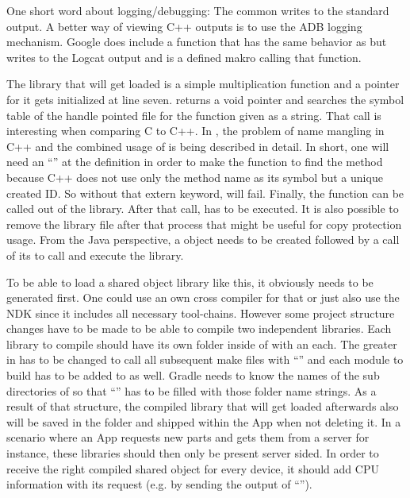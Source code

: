 One short word about logging/debugging: The common  writes to the standard output. A better way of viewing C++ outputs is to use the ADB logging mechanism. Google does include a  function that
has the same behavior as  but writes to the Logcat output and
 is a defined makro calling that function.

The library that will get loaded is a simple multiplication function and a pointer
for it gets initialized at line seven.  returns a void pointer and
 searches the symbol table of the handle pointed file for the function
given as a string. That call is interesting when comparing C to C++. In
\parencite{dlopen_howto}, the problem of name mangling in C++ and the combined usage of
 is being described in detail.
In short, one will need an ``'' at the  definition in order to make the  function to find the method
because C++ does not use only the method name as its symbol but a unique created ID.
So without that extern keyword,  will fail.
Finally, the  function can be called out of the library.
After that call,  has to be executed. It is also possible to remove
the library file after that process that might be useful for copy protection usage.
From the Java perspective, a  object needs to be created followed by
a call of its  to call and execute the library.

To be able to load a shared object library like this, it obviously needs to be
generated first. One could use an own cross compiler for that or just also use
the NDK since it includes all necessary tool-chains.
However some project structure changes have to be made to be able to compile two independent libraries. Each library to compile should have its own folder inside
of  with an  each. The greater  in
 has to be changed to call all subsequent make files with
``'' and each module to build has to be
added to  as well. Gradle needs to know the names of the sub
directories of  so that ``'' has to be
filled with those folder name strings. As a result of that structure, the compiled
library that will get loaded afterwards also will be saved in the  folder
and shipped within the App when not deleting it. In a scenario where an App requests new
parts and gets them from a server for instance, these libraries should then only be
present server sided. In order to receive the right compiled shared object for every
device, it should add CPU information with its request (e.g. by sending the output
of ``'').

